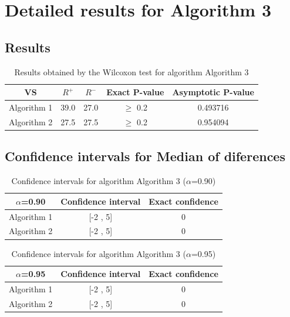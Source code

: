 \documentclass[a4paper,10pt]{article}
\begin{document}
 \clearpage 


\section{Detailed results for Algorithm 3}


\subsection{Results}

\begin{table}[!htp]
\centering\small
\begin{tabular}{
|c|c|c|c|c|}
\hline
 VS & $R^{+}$ & $R^{-}$ & Exact P-value & Asymptotic P-value \\ \hline 
Algorithm 1 & 39.0 & 27.0 & $\geq$ 0.2 & 0.493716\\ \hline 
Algorithm 2 & 27.5 & 27.5 & $\geq$ 0.2 & 0.954094\\ \hline 

\end{tabular}
\caption{Results obtained by the Wilcoxon test for algorithm Algorithm 3}
\end{table}

\subsection{Confidence intervals for Median of diferences}

\begin{table}[!htp]
\centering\small
\begin{tabular}{
|c|c|c|}
\hline
 $\alpha$=0.90 & Confidence interval & Exact confidence \\ \hline 
Algorithm 1 & [-2 , 5] & 0\\ \hline 
Algorithm 2 & [-2 , 5] & 0\\ \hline 

\end{tabular}
\caption{Confidence intervals for algorithm Algorithm 3 ($\alpha$=0.90)}
\end{table}
\begin{table}[!htp]
\centering\small
\begin{tabular}{
|c|c|c|}
\hline
 $\alpha$=0.95 & Confidence interval & Exact confidence \\ \hline 
Algorithm 1 & [-2 , 5] & 0\\ \hline 
Algorithm 2 & [-2 , 5] & 0\\ \hline 

\end{tabular}
\caption{Confidence intervals for algorithm Algorithm 3 ($\alpha$=0.95)}
\end{table}

 \clearpage 
\end{document}
